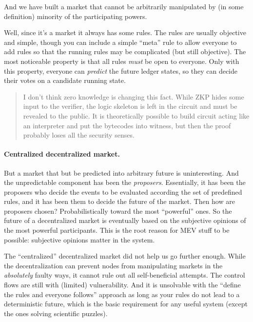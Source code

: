 And we have built a market that cannot be arbitrarily manipulated by (in some definition) minority of the participating powers.

Well, since it's a market it always has some rules.
The rules are usually objective and simple, though you can include a simple ``meta'' rule to allow everyone to add rules so that the running rules may be complicated (but still objective).
The most noticeable property is that all rules \emph{must} be open to everyone.
Only with this property, everyone can \emph{predict} the future ledger states, so they can decide their votes on a candidate running state.

\begin{quote}
    \small
    I don't think zero knowledge is changing this fact.
    While ZKP hides some input to the verifier, the logic skeleton is left in the circuit and must be revealed to the public.
    It is theoretically possible to build circuit acting like an interpreter and put the bytecodes into witness, but then the proof probably loses all the security senses.
\end{quote}

\paragraph{Centralized decentralized market.}
But a market that but be predicted into arbitrary future is uninteresting.
And the unpredictable component has been the \emph{proposers}.
Essentially, it has been the proposers who decide the events to be evaluated according the set of predefined rules, and it has been them to decide the future of the market.
Then how are proposers chosen?
Probabilistically toward the most ``powerful'' ones.
So the future of a decentralized market is eventually based on the subjective opinions of the most powerful participants.
This is the root reason for MEV stuff to be possible: subjective opinions matter in the system.

The ``centralized'' decentralized market did not help us go further enough.
While the decentralization can prevent nodes from manipulating markets in the \emph{absolutely} faulty ways, it cannot rule out all self-beneficial attempts.
The control flows are still with (limited) vulnerability.
And it is unsolvable with the ``define the rules and everyone follows'' approach as long as your rules do not lead to a deterministic future, which is the basic requirement for any useful system (except the ones solving scientific puzzles).

